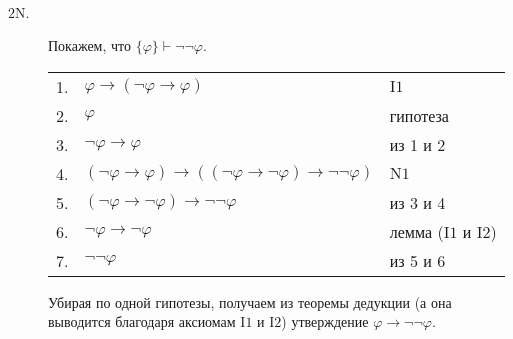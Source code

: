 \documentclass[12pt,a4paper]{article}
\begin{document}
    \begin{enumproblem}\ 
        \begin{description}
            \item[$\mathrm{2N}$.] Покажем, что $\{\varphi\} \vdash \neg \neg \varphi$.
                \begin{center}
                    \begin{tabular}{rll}
                        1.& $\varphi \rightarrow (\neg \varphi \rightarrow \varphi)$& $\mathrm{I1}$\\
                        2.& $\varphi$& гипотеза\\
                        3.& $\neg \varphi \rightarrow \varphi$& из 1 и 2\\
                        4.& $(\neg \varphi \rightarrow \varphi) \rightarrow ((\neg \varphi \rightarrow \neg \varphi) \rightarrow \neg \neg \varphi)$& $\mathrm{N1}$\\
                        5.& $(\neg \varphi \rightarrow \neg \varphi) \rightarrow \neg \neg \varphi$& из 3 и 4\\
                        6.& $\neg \varphi \rightarrow \neg \varphi$& лемма ($\mathrm{I1}$ и $\mathrm{I2}$)\\
                        7.& $\neg \neg \varphi$& из 5 и 6\\
                    \end{tabular}
                \end{center}
                Убирая по одной гипотезы, получаем из теоремы дедукции (а она выводится благодаря аксиомам $\mathrm{I1}$ и $\mathrm{I2}$) утверждение $\varphi \rightarrow \neg \neg \varphi$.


\end{description}
\end{enumproblem}
\end{document}
